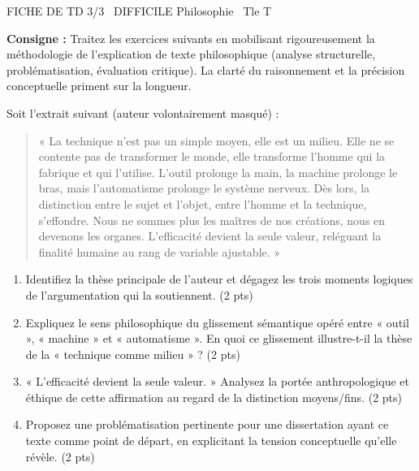 \documentclass[11pt]{article}
\begin{document}
\begin{tcolorbox}[enhanced,colback=popink,colframe=popink,arc=10pt,boxrule=0pt,left=12pt,right=12pt,top=9pt,bottom=9pt]
{\color{white}\popxbold\small FICHE DE TD 3/3 \textbullet\ DIFFICILE \hfill Philosophie \textbullet\ Tle T\par}
\end{tcolorbox}
\vspace{4pt}
\noindent \textbf{Consigne :} Traitez les exercices suivants en mobilisant rigoureusement la méthodologie de l'explication de texte philosophique (analyse structurelle, problématisation, évaluation critique). La clarté du raisonnement et la précision conceptuelle priment sur la longueur.

\begin{exercice}
Soit l'extrait suivant (auteur volontairement masqué) : 
\begin{quote}
« La technique n'est pas un simple moyen, elle est un milieu. Elle ne se contente pas de transformer le monde, elle transforme l'homme qui la fabrique et qui l'utilise. L'outil prolonge la main, la machine prolonge le bras, mais l'automatisme prolonge le système nerveux. Dès lors, la distinction entre le sujet et l'objet, entre l'homme et la technique, s'effondre. Nous ne sommes plus les maîtres de nos créations, nous en devenons les organes. L'efficacité devient la seule valeur, reléguant la finalité humaine au rang de variable ajustable. »
\end{quote}
\begin{enumerate}
    \item Identifiez la thèse principale de l'auteur et dégagez les trois moments logiques de l'argumentation qui la soutiennent. (2 pts)
    \item Expliquez le sens philosophique du glissement sémantique opéré entre « outil », « machine » et « automatisme ». En quoi ce glissement illustre-t-il la thèse de la « technique comme milieu » ? (2 pts)
    \item « L'efficacité devient la seule valeur. » Analysez la portée anthropologique et éthique de cette affirmation au regard de la distinction moyens/fins. (2 pts)
    \item Proposez une problématisation pertinente pour une dissertation ayant ce texte comme point de départ, en explicitant la tension conceptuelle qu'elle révèle. (2 pts)
\end{enumerate}
\end{exercice}
\end{document}
